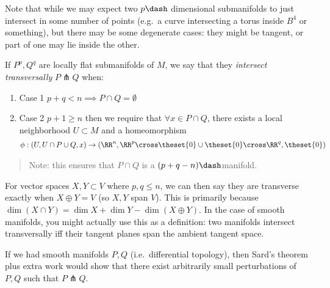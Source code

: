Note that while we may expect two \(p\dash\) dimensional submanifolds to
just intersect in some number of points (e.g.~a curve intersecting a
torus inside \(B^4\) or something), but there may be some degenerate
cases: they might be tangent, or part of one may lie inside the other.

\begin{definition}

If \(P^p, Q^q\) are locally flat submanifolds of \(M\), we say that they
\emph{intersect transversally} \(P \pitchfork Q\) when:

\begin{enumerate}
\def\labelenumi{\arabic{enumi}.}
\item
  Case 1 \(p+q < n \implies P \cap Q = \emptyset\)
\item
  Case 2 \(p+1 \geq n\) then we require that \(\forall x\in P \cap Q\),
  there exists a local neighborhood \(U \subset M\) and a homeomorphism
  \begin{align*}\phi: (U, U\cap P\cup Q, x) \to (\RR^n, \RR^p \cross \theset{0} \cup \theset{0} \cross \RR^q, \theset{0})\end{align*}
\end{enumerate}

\begin{quote}
Note: this ensures that \(P\cap Q\) is a \((p+q-n)\dash\)manifold.
\end{quote}

\end{definition}

\begin{remark}

For vector spaces \(X, Y \subset V\) where \(p,q \leq n\), we can then
say they are transverse exactly when \(X \oplus Y = V\) (so \(X, Y\)
span \(V\)). This is primarily because
\(\dim (X \cap Y) = \dim X + \dim Y - \dim(X\oplus Y)\). In the case of
smooth manifolds, you might actually use this as a definition: two
manifolds intersect transversally iff their tangent planes span the
ambient tangent space.

\end{remark}

\begin{remark}

If we had smooth manifolds \(P, Q\) (i.e.~differential topology), then
Sard's theorem plus extra work would show that there exist arbitrarily
small perturbations of \(P, Q\) such that \(P \pitchfork Q\).

\end{remark}

